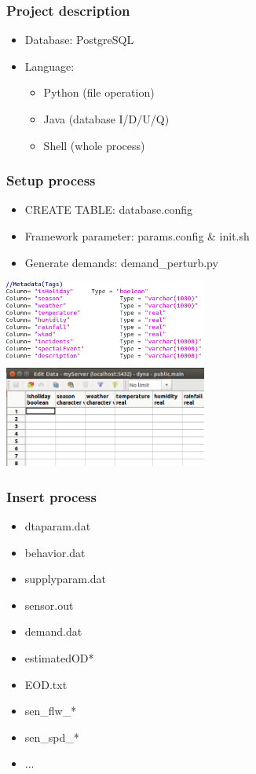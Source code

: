 \documentclass[12pt]{beamer}
\begin{document}
\begin{frame}
\frametitle{Project description}
\begin{itemize}
\item Database: PostgreSQL
\item Language: 
\begin{itemize}
      \item{Python (file operation)}
      \item{Java (database I/D/U/Q)}
      \item{Shell (whole process)}
\end{itemize}
\end{itemize}
\end{frame}



\begin{frame}
\frametitle{Setup process}
\begin{itemize}
\item CREATE TABLE: database.config
\item Framework parameter: params.config \& init.sh
\item Generate demands: demand\_perturb.py 
\end{itemize}
\includegraphics[width = 0.5\textwidth]{screenshot_table.png}
\includegraphics[width = 0.5\textwidth]{screenshot_pgadmin.png}
\end{frame}



\begin{frame}
\frametitle{Insert process}
\begin{itemize}
\item dtaparam.dat
\item behavior.dat
\item supplyparam.dat
\item sensor.out
\item demand.dat
\item estimatedOD*
\item EOD.txt
\item sen\_flw\_*
\item sen\_spd\_*
\item ...
\end{itemize}
\end{frame}
\end{document}

